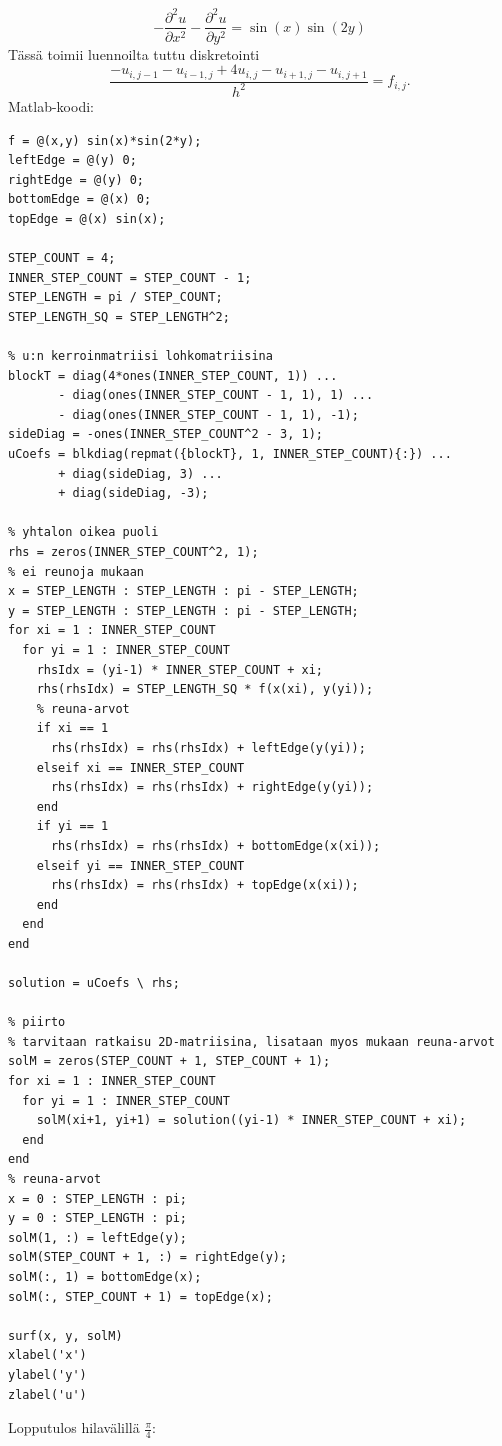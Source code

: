 \documentclass{article}
\begin{document}
\[
  -\frac{\partial^2 u}{\partial x^2} - \frac{\partial^2 u}{\partial y^2} = \sin(x)\sin(2y)
\]
Tässä toimii luennoilta tuttu diskretointi
\[
  \frac{-u_{i,j-1} - u_{i-1,j} + 4u_{i,j} - u_{i+1,j} - u_{i,j+1}}{h^2} = f_{i,j}.
\]
Matlab-koodi:
\begin{verbatim}
f = @(x,y) sin(x)*sin(2*y);
leftEdge = @(y) 0;
rightEdge = @(y) 0;
bottomEdge = @(x) 0;
topEdge = @(x) sin(x);

STEP_COUNT = 4;
INNER_STEP_COUNT = STEP_COUNT - 1;
STEP_LENGTH = pi / STEP_COUNT;
STEP_LENGTH_SQ = STEP_LENGTH^2;

% u:n kerroinmatriisi lohkomatriisina
blockT = diag(4*ones(INNER_STEP_COUNT, 1)) ...
       - diag(ones(INNER_STEP_COUNT - 1, 1), 1) ...
       - diag(ones(INNER_STEP_COUNT - 1, 1), -1);
sideDiag = -ones(INNER_STEP_COUNT^2 - 3, 1);
uCoefs = blkdiag(repmat({blockT}, 1, INNER_STEP_COUNT){:}) ...
       + diag(sideDiag, 3) ...
       + diag(sideDiag, -3);

% yhtalon oikea puoli
rhs = zeros(INNER_STEP_COUNT^2, 1);
% ei reunoja mukaan
x = STEP_LENGTH : STEP_LENGTH : pi - STEP_LENGTH;
y = STEP_LENGTH : STEP_LENGTH : pi - STEP_LENGTH;
for xi = 1 : INNER_STEP_COUNT
  for yi = 1 : INNER_STEP_COUNT
    rhsIdx = (yi-1) * INNER_STEP_COUNT + xi;
    rhs(rhsIdx) = STEP_LENGTH_SQ * f(x(xi), y(yi));
    % reuna-arvot
    if xi == 1
      rhs(rhsIdx) = rhs(rhsIdx) + leftEdge(y(yi));
    elseif xi == INNER_STEP_COUNT
      rhs(rhsIdx) = rhs(rhsIdx) + rightEdge(y(yi));
    end
    if yi == 1
      rhs(rhsIdx) = rhs(rhsIdx) + bottomEdge(x(xi));
    elseif yi == INNER_STEP_COUNT
      rhs(rhsIdx) = rhs(rhsIdx) + topEdge(x(xi));
    end
  end
end

solution = uCoefs \ rhs;

% piirto
% tarvitaan ratkaisu 2D-matriisina, lisataan myos mukaan reuna-arvot
solM = zeros(STEP_COUNT + 1, STEP_COUNT + 1);
for xi = 1 : INNER_STEP_COUNT
  for yi = 1 : INNER_STEP_COUNT
    solM(xi+1, yi+1) = solution((yi-1) * INNER_STEP_COUNT + xi);
  end
end
% reuna-arvot
x = 0 : STEP_LENGTH : pi;
y = 0 : STEP_LENGTH : pi;
solM(1, :) = leftEdge(y);
solM(STEP_COUNT + 1, :) = rightEdge(y);
solM(:, 1) = bottomEdge(x);
solM(:, STEP_COUNT + 1) = topEdge(x);

surf(x, y, solM)
xlabel('x')
ylabel('y')
zlabel('u')

\end{verbatim}

Lopputulos hilavälillä $\frac{\pi}{4}$:
\end{document}
